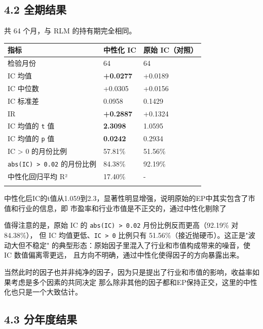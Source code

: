 \documentclass[UTF8,a4paper,11pt]{ctexart}
\begin{document}
{}
\subsection*{4.2 全期结果}

共 64 个月，与 RLM 的持有期完全相同。

\begin{table}[htbp]
\centering
\begin{tabularx}{\textwidth}{@{}YYY@{}}
\toprule
指标 & 中性化 IC & 原始 IC（对照） \\
\midrule
检验月份 & 64 & 64 \\
IC 均值 & \textbf{+0.0277} & +0.0189 \\
IC 中位数 & +0.0305 & +0.0156 \\
IC 标准差 & 0.0958 & 0.1429 \\
IR & \textbf{+0.2887} & +0.1324 \\
IC 均值的  \texttt{t} 值 & \textbf{2.3098} & 1.0595 \\
IC 均值的  \texttt{p} 值 & \textbf{0.0242} & 0.2934 \\
IC > 0 的月份比例 & 57.81\% & 51.56\% \\
\texttt{abs(IC) > 0.02} 的月份比例 & 84.38\% & 92.19\% \\
中性化回归平均 R² & 17.40\% & - \\
 &  &  \\
\bottomrule
\end{tabularx}
\end{table}

中性化后IC的t值从1.059到2.3，显著性明显增强，说明原始的EP中其实包含了市值和行业的信息，即
市盈率和行业市值是不正交的，通过中性化剔除了

值得注意的是，原始 IC 的 \texttt{abs(IC) > 0.02} 月份比例反而更高（92.19\% 对 84.38\%），
但 IC 均值更低、\texttt{IC > 0} 比例只有 51.56\%（接近抛硬币）。这正是"波动大但不稳定"
的典型形态：原始因子里混入了行业和市值构成带来的噪音，使 IC 数值偏离零更远，
且方向不明确，通过中性化使得因子的方向暴露出来。

当然此时的因子也并非纯净的因子，因为只是提出了行业和市值的影响，收益率如果考虑是多个因素的共同决定
那么除非其他的因子都和EP保持正交，这里的中性化也只是一个大致估计。

{}
\subsection*{4.3 分年度结果}
\end{document}
